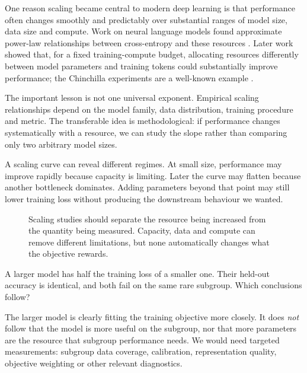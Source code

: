 One reason scaling became central to modern deep learning is that performance often changes smoothly and predictably over substantial ranges of model size, data size and compute. Work on neural language models found approximate power-law relationships between cross-entropy and these resources \parencite{kaplan2020}. Later work showed that, for a fixed training-compute budget, allocating resources differently between model parameters and training tokens could substantially improve performance; the Chinchilla experiments are a well-known example \parencite{hoffmann2022}.

The important lesson is not one universal exponent. Empirical scaling relationships depend on the model family, data distribution, training procedure and metric. The transferable idea is methodological: if performance changes systematically with a resource, we can study the slope rather than comparing only two arbitrary model sizes.

A scaling curve can reveal different regimes. At small size, performance may improve rapidly because capacity is limiting. Later the curve may flatten because another bottleneck dominates. Adding parameters beyond that point may still lower training loss without producing the downstream behaviour we wanted.

\begin{figure}[ht]
  \caption{Scaling studies should separate the resource being increased from the quantity being measured. Capacity, data and compute can remove different limitations, but none automatically changes what the objective rewards.}
  \label{fig:week10-scaling}
\end{figure}

\begin{checkpointbox}
A larger model has half the training loss of a smaller one. Their held-out accuracy is identical, and both fail on the same rare subgroup. Which conclusions follow?

The larger model is clearly fitting the training objective more closely. It does \emph{not} follow that the model is more useful on the subgroup, nor that more parameters are the resource that subgroup performance needs. We would need targeted measurements: subgroup data coverage, calibration, representation quality, objective weighting or other relevant diagnostics.
\end{checkpointbox}

